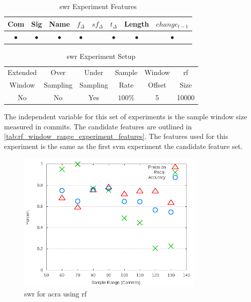 \begin{table}[h]
\begin{center}

    \begin{tabular}{|c|c|c|c|c|c|c|c|}
        \hline
        Com & Sig & Name & $f_{\Delta}$ & $sf_{\Delta}$ & $t_\Delta$ & Length & $change_{t-1}$ \\
         \hline
        $\bullet$ & $\bullet$ & $\bullet$ & $\bullet$ & & $\bullet$ & $\bullet$ & $\bullet$ \\ \hline
    \end{tabular}
    \caption{\gls{swr} Experiment Features}
    \label{tab:rf_window_range_experiment_features}
\end{center}

\end{table}

\begin{table}[h]
\begin{center}

    \begin{tabular}{|c|c|c|c|c|c|}
        \hline
        Extended & Over & Under & Sample & Window & \gls{rf} \\
        Window & Sampling & Sampling & Rate & Offset & Size \\ \hline
        No & No & Yes & $100\%$ & 5 & 10000 \\ \hline
    \end{tabular}
    \caption{\gls{swr} Experiment Setup}
    \label{tab:rf_window_range_experiment_setup}
\end{center}

\end{table}

The independent variable for this set of experiments is the sample window size measured in commits. The candidate features are outlined in \autoref{tab:rf_window_range_experiment_features}. The features used for this experiment is the same as the first \gls{svm} experiment the candidate feature set.

\begin{figure}[!t]
    \centering
        \includegraphics[width=0.8\textwidth]{images/rf/test_1/acra_sample_range}
        \caption{\gls{swr} for acra using \gls{rf}}
        \label{fig:test_1_acra_rf}
\end{figure}

